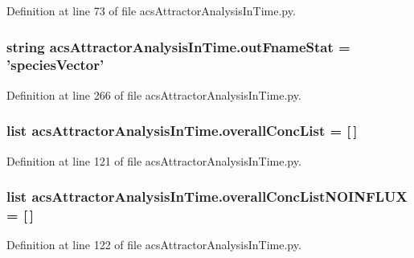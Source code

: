 Definition at line 73 of file acs\-Attractor\-Analysis\-In\-Time.\-py.

\hypertarget{a00123_a05e902a00f3333a303563029c80605de}{
\subsubsection[{out\-Fname\-Stat}]{\setlength{\rightskip}{0pt plus 5cm}string acs\-Attractor\-Analysis\-In\-Time.\-out\-Fname\-Stat = 'species\-Vector'}}\label{a00123_a05e902a00f3333a303563029c80605de}


Definition at line 266 of file acs\-Attractor\-Analysis\-In\-Time.\-py.

\hypertarget{a00123_a2cebadd75179c46e551a2facbdd2741b}{
\subsubsection[{overall\-Conc\-List}]{\setlength{\rightskip}{0pt plus 5cm}list acs\-Attractor\-Analysis\-In\-Time.\-overall\-Conc\-List = \mbox{[}$\,$\mbox{]}}}\label{a00123_a2cebadd75179c46e551a2facbdd2741b}


Definition at line 121 of file acs\-Attractor\-Analysis\-In\-Time.\-py.

\hypertarget{a00123_ad7eab833592c6cd395f9e2416dd13920}{
\subsubsection[{overall\-Conc\-List\-N\-O\-I\-N\-F\-L\-U\-X}]{\setlength{\rightskip}{0pt plus 5cm}list acs\-Attractor\-Analysis\-In\-Time.\-overall\-Conc\-List\-N\-O\-I\-N\-F\-L\-U\-X = \mbox{[}$\,$\mbox{]}}}\label{a00123_ad7eab833592c6cd395f9e2416dd13920}


Definition at line 122 of file acs\-Attractor\-Analysis\-In\-Time.\-py.

